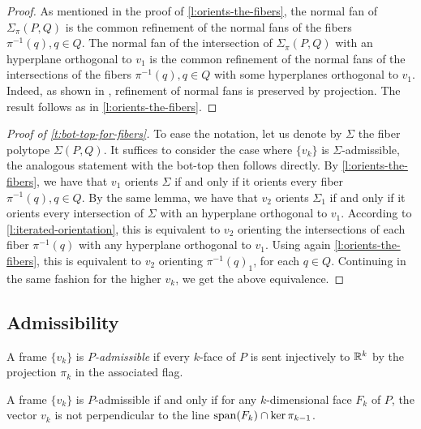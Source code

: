 \begin{proof}
	As mentioned in the proof of \cref{l:orients-the-fibers}, the normal fan of $\Sigma_\pi(P,Q)$ is the common refinement of the normal fans of the fibers $\pi^{-1}(q), q \in Q$.
	The normal fan of the intersection of $\Sigma_\pi(P,Q)$ with an hyperplane orthogonal to $v_1$ is the common refinement of the normal fans of the intersections of the fibers $\pi^{-1}(q), q \in Q$ with some hyperplanes orthogonal to $v_1$.
	Indeed, as shown in \cite[Lemma 3.1]{BilleraSturmfels94}, refinement of normal fans is preserved by projection.
	The result follows as in \cref{l:orients-the-fibers}.
\end{proof}

\begin{proof}[Proof of \cref{t:bot-top-for-fibers}]
	To ease the notation, let us denote by $\Sigma$ the fiber polytope $\Sigma(P,Q)$.
	It suffices to consider the case where $\{v_k\}$ is $\Sigma$-admissible, the analogous statement with the bot-top then follows directly.
	By \cref{l:orients-the-fibers}, we have that $v_1$ orients $\Sigma$ if and only if it orients every fiber $\pi^{-1}(q), q \in Q$.
	By the same lemma, we have that $v_2$ orients $\Sigma_1$ if and only if it orients every intersection of $\Sigma$ with an hyperplane orthogonal to $v_1$.
	According to \cref{l:iterated-orientation}, this is equivalent to $v_2$ orienting the intersections of each fiber $\pi^{-1}(q)$ with any hyperplane orthogonal to $v_1$.
	Using again \cref{l:orients-the-fibers}, this is equivalent to $v_2$ orienting $\pi^{-1}(q)_1$, for each $q \in Q$.
	Continuing in the same fashion for the higher $v_k$, we get the above equivalence.
\end{proof}

\subsection{Admissibility}

A frame $\{v_k\}$ is \emph{$P$-admissible} if every $k$-face of $P$ is sent injectively to $\mathbb{R}^k$ by the projection $\pi_k$ in the associated flag.

\begin{lemma} \label{l:P-admissible}
	A frame $\{v_k\}$ is $P$-admissible if and only if for any $k$-dimensional face $F_k$ of $P$, the vector $v_k$ is not perpendicular to the line $\operatorname{\mathrm{span}}(F_k) \cap \ker \pi_{k-1}$.
\end{lemma}

